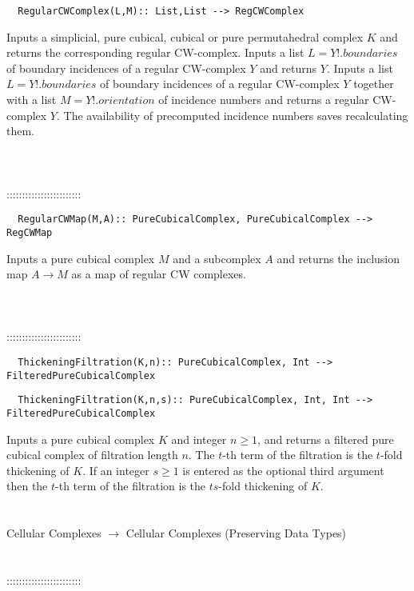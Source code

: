 \documentclass[a4paper,11pt]{report}
\begin{document}
{\begin{verbatim}  RegularCWComplex(L,M):: List,List --> RegCWComplex
\end{verbatim}


 

Inputs a simplicial, pure cubical, cubical or pure permutahedral complex $K$ and returns the corresponding regular CW-complex. Inputs a list $L=Y!.boundaries$ of boundary incidences of a regular CW-complex $Y$ and returns $Y$. Inputs a list $L=Y!.boundaries$ of boundary incidences of a regular CW-complex $Y$ together with a list $M=Y!.orientation$ of incidence numbers and returns a regular CW-complex $Y$. The availability of precomputed incidence numbers saves recalculating them. \\
 \\
 \\
 \\
 ::::::::::::::::::::::::\\
 
\begin{verbatim}  RegularCWMap(M,A):: PureCubicalComplex, PureCubicalComplex --> RegCWMap
\end{verbatim}


 

 Inputs a pure cubical complex $M$ and a subcomplex $A$ and returns the inclusion map $A \rightarrow M$ as a map of regular CW complexes. \\
 \\
 \\
 \\
 ::::::::::::::::::::::::\\
 
\begin{verbatim}  ThickeningFiltration(K,n):: PureCubicalComplex, Int --> FilteredPureCubicalComplex
\end{verbatim}
 
\begin{verbatim}  ThickeningFiltration(K,n,s):: PureCubicalComplex, Int, Int --> FilteredPureCubicalComplex
\end{verbatim}


 

 Inputs a pure cubical complex $K$ and integer $n \ge 1$, and returns a filtered pure cubical complex of filtration length $n$. The $t$-th term of the filtration is the $t$-fold thickening of $K$. If an integer $s \ge 1$ is entered as the optional third argument then the $t$-th term of the filtration is the $ts$-fold thickening of $K$. \\
 \\
 \\
 Cellular Complexes $\longrightarrow$ Cellular Complexes (Preserving Data Types) \\
 \\
 \\
 ::::::::::::::::::::::::\\
 
}
\end{document}
